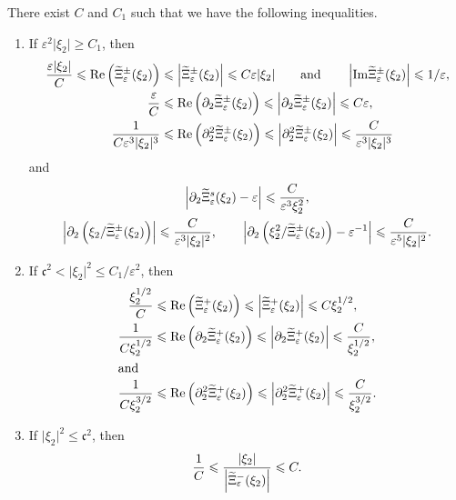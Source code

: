 \documentclass[AHL,Unicode,longabstracts,published]{cedram}
\newcommand*\p{\partial}
\newcommand{\Imm}{\mathrm{Im}}
\newcommand{\Rel}{\mathrm{Re}}
\newcommand*\cs{{\mathfrak c}}
\newcommand*\gs{\geqslant }
\newcommand*\ls{\leqslant }
\newcommand*\e{\varepsilon}
\renewcommand*\t{\tilde}
\newcommand*{\romanenumi}{\renewcommand*{\theenumi}{\roman{enumi}}}
\let\oldtilde\tilde
\renewcommand*{\tilde}[1]{\mathchoice{\widetilde{#1}}{\widetilde{#1}}{\oldtilde{#1}}{\oldtilde{#1}}}
\begin{document}
\begin{prop}\label{asym_Ztilde}
There exist $ C $ and $ C_1 $ such that we have the following inequalities.
\begin{enumerate}\romanenumi
\item\label{prop3.4.1} If $ \e^2 \lvert \xi_2 \rvert \gs C_1 $, then
\begin{align*}
\frac{\e | \xi_2|} {C } \ls \Rel \left(\t{\Xi}_\e^\pm (\xi_2) \right)
&\ls \left\lvert \t{\Xi}_\e^\pm (\xi_2) \right\rvert
\ls C \e | \xi_2|
\qquad \text{and} \qquad
\left\lvert {\Imm} \t{\Xi}_\e^\pm (\xi_2) \right\rvert \ls 1/\e,
\\
\frac{\e } {C } &\ls \Rel \left(\p_2 \t{\Xi}_\e^\pm (\xi_2) \right)
\ls \left\lvert \p_2 \t{\Xi}_\e^\pm (\xi_2) \right\rvert
\ls C \e,
\\
\frac{1 } {C \e^3 | \xi_2|^3 } &\ls \Rel \left(\p_2^2 \t{\Xi}_\e^\pm (\xi_2) \right)
\ls \left\lvert \p_2^2 \t{\Xi}_\e^\pm (\xi_2) \right\rvert
\ls \frac{C } { \e^3 | \xi_2|^3 }
\end{align*}
and
\begin{gather*}
\left\lvert \p_2 \t\Xi_\e^s (\xi_2) - \e \right\rvert
\ls \frac{ C}{ \e^3 \xi_2^2 },
\\
\left\lvert \p_2 \left(\xi_2 / \t{\Xi}_\e^\pm (\xi_2) \right) \right\rvert
\ls \frac{C } { \e^3 | \xi_2|^2 },
\qquad
\left\lvert \p_2 \left(\xi_2^2 / \t{\Xi}_\e^\pm (\xi_2) \right) - \e^{-1} \right\rvert
\ls \frac{C }{ \e^5 | \xi_2|^2 }.
\end{gather*}

\item\label{prop3.4.2} If $ \cs^2 < \lvert \xi_2 \rvert^2 \ls C_1 / \e^2 $, then
\begin{align*}
\frac{\xi_2^{1/2}}{C} &\ls \Rel \left(\t{\Xi}_\e^+ (\xi_2) \right)
\ls \left\lvert \t{\Xi}_\e^+ (\xi_2) \right\rvert \ls C \xi_2^{1/2},
\\
\frac{1}{C \xi_2^{1/2} } &\ls \Rel \left(\p_2 \t{\Xi}_\e^+ (\xi_2) \right)
\ls \left\lvert \p_2 \t{\Xi}_\e^+ (\xi_2) \right\rvert \ls \frac{C }{ \xi_2^{1/2} },
\\
\intertext{and}
\frac{1}{C \xi_2^{3/2} } &\ls \Rel \left(\p_2^2 \t{\Xi}_\e^+ (\xi_2) \right)
\ls \left\lvert \p_2^2 \t{\Xi}_\e^+ (\xi_2) \right\rvert \ls \frac{C }{ \xi_2^{3/2} }.
\end{align*}

\item\label{prop3.4.3} If $ \lvert \xi_2 \rvert^2 \ls \cs^2 $, then
\[
\frac{1}{C} \ls \frac{\lvert \xi_2 \rvert}{ \left\lvert \t\Xi_\e^- (\xi_2) \right\rvert } \ls C.
\]
\end{enumerate}
\end{prop}
\end{document}
